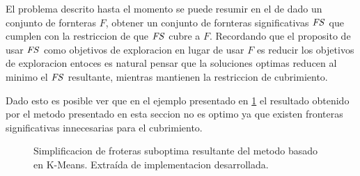 
El problema descrito hasta el momento se puede resumir en el de  dado un
conjunto de fornteras $F$, obtener un conjunto de fornteras significativas
$\mathit{FS}$ que cumplen con la restriccion de que $\mathit{FS}$ cubre a $F$.
Recordando que el proposito de usar $\mathit{FS}$ como objetivos de exploracion en
lugar de usar $F$ es reducir los objetivos de exploracion entoces es natural
pensar que la soluciones optimas reducen al minimo el $\mathit{FS}$ resultante,
mientras mantienen la restriccion de cubrimiento.


Dado esto es posible ver que en el ejemplo presentado en
\ref{fig:ejemploFSKMMal} el resultado obtenido por el metodo presentado en esta
seccion no es optimo ya que existen fronteras significativas innecesarias para
el cubrimiento. 

\begin{figure}[H]
  \centering
  \qquad

  \caption[Simplificacion de fronteras suboptima resultante del metodo basado en K-Means.]{Simplificacion de froteras suboptima resultante del metodo basado en K-Means. Extraída de implementacion desarrollada\footnotemark.}\label{fig:ejemploFSKMMal}
\end{figure}


